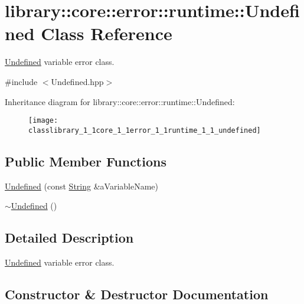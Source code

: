 \hypertarget{classlibrary_1_1core_1_1error_1_1runtime_1_1_undefined}{}\section{library\+:\+:core\+:\+:error\+:\+:runtime\+:\+:Undefined Class Reference}
\label{classlibrary_1_1core_1_1error_1_1runtime_1_1_undefined}


\hyperlink{classlibrary_1_1core_1_1error_1_1runtime_1_1_undefined}{Undefined} variable error class.  




{\ttfamily \#include $<$Undefined.\+hpp$>$}

Inheritance diagram for library\+:\+:core\+:\+:error\+:\+:runtime\+:\+:Undefined\+:\begin{figure}[H]
\begin{center}
\leavevmode
\texttt{[image: classlibrary\_1\_1core\_1\_1error\_1\_1runtime\_1\_1\_undefined]}
\end{center}
\end{figure}
\subsection*{Public Member Functions}
\begin{DoxyCompactItemize}
\item 
\hyperlink{classlibrary_1_1core_1_1error_1_1runtime_1_1_undefined_a585cecbe505147926980971fed942b95}{Undefined} (const \hyperlink{classlibrary_1_1core_1_1types_1_1_string}{String} \&a\+Variable\+Name)
\item 
\hyperlink{classlibrary_1_1core_1_1error_1_1runtime_1_1_undefined_a9069574e62bbe7aabab0519b6052cb69}{$\sim$\+Undefined} ()
\end{DoxyCompactItemize}


\subsection{Detailed Description}
\hyperlink{classlibrary_1_1core_1_1error_1_1runtime_1_1_undefined}{Undefined} variable error class. 

\subsection{Constructor \& Destructor Documentation}
\mbox{\label{classlibrary_1_1core_1_1error_1_1runtime_1_1_undefined_a585cecbe505147926980971fed942b95}} 
